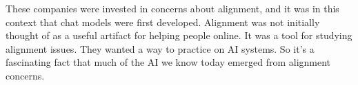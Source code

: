 These companies were invested in concerns about alignment, and it was in this context that chat models were first developed. Alignment was not initially thought of as a useful artifact for helping people online. It was a tool for studying alignment issues. They wanted a way to practice on AI systems. So it's a fascinating fact that much of the AI we know today emerged from alignment concerns. %


%
%

